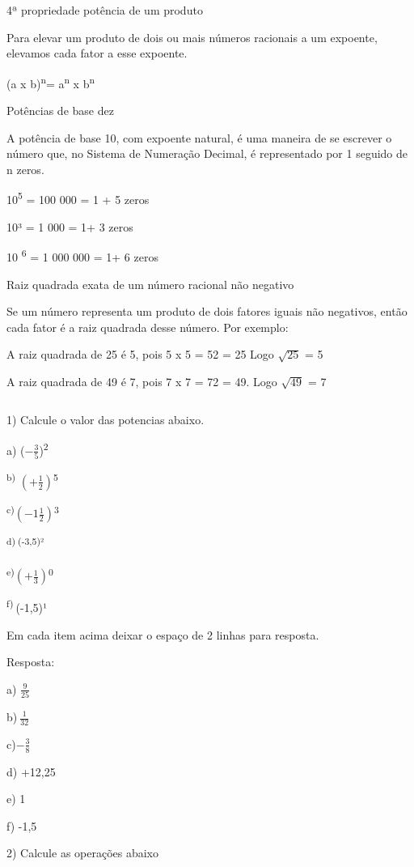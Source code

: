4ª propriedade potência de um produto

Para elevar um produto de dois ou mais números racionais a um expoente,
elevamos cada fator a esse expoente.

(a x b)\textsuperscript{n}= a\textsuperscript{n} x b\textsuperscript{n}

Potências de base dez

A potência de base 10, com expoente natural, é uma maneira de se
escrever o número que, no Sistema de Numeração Decimal, é representado
por 1 seguido de n zeros.

10\textsuperscript{5} = 100 000 = 1 + 5 zeros

10³ = 1 000 = 1+ 3 zeros

10 \textsuperscript{6} = 1 000 000 = 1+ 6 zeros

Raiz quadrada exata de um número racional não negativo

Se um número representa um produto de dois fatores iguais não negativos,
então cada fator é a raiz quadrada desse número. Por exemplo:

A raiz quadrada de 25 é 5, pois 5 x 5 = 52 = 25 Logo \(\sqrt{25}\) = 5

A raiz quadrada de 49 é 7, pois 7 x 7 = 72 = 49. Logo \(\sqrt{49}\) = 7


\[\ \]

1) Calcule o valor das potencias abaixo.

a) (\(- \frac{3}{5}\))\textsuperscript{2}

\textsuperscript{b)} \(( + \frac{1}{2})\)\textsuperscript{5}

\textsuperscript{c)}\(( - 1\frac{1}{2})\)\textsuperscript{3}

\textsuperscript{d)}\(\ \)\textsuperscript{(-3,5)²}

\textsuperscript{e)}\(( + \frac{1}{3})\)\textsuperscript{0}

\textsuperscript{f)}\(\ \)(-1,5)¹

Em cada item acima deixar o espaço de 2 linhas para resposta.

Resposta:

a) \(\frac{9}{25}\)

b)\(\ \frac{1}{32}\)

c)\(- \frac{3}{8}\)

d) +12,25

e) 1

f) -1,5\(\ \)

2) Calcule as operações abaixo


